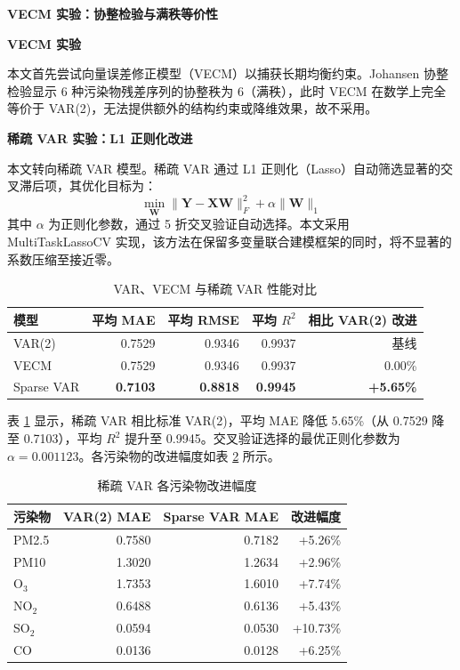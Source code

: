\documentclass[UTF8,a4paper,12pt]{ctexart}
\begin{document}
\textbf{VECM 实验：协整检验与满秩等价性}

\textbf{VECM 实验}

本文首先尝试向量误差修正模型（VECM）以捕获长期均衡约束。Johansen 协整检验显示 6 种污染物残差序列的协整秩为 6（满秩），此时 VECM 在数学上完全等价于 VAR(2)，无法提供额外的结构约束或降维效果，故不采用。

\textbf{稀疏 VAR 实验：L1 正则化改进}

本文转向稀疏 VAR 模型。稀疏 VAR 通过 L1 正则化（Lasso）自动筛选显著的交叉滞后项，其优化目标为：
\begin{equation}
\label{eq:sparse_var}
\min_{\mathbf{W}} \|\mathbf{Y} - \mathbf{X}\mathbf{W}\|_F^2 + \alpha\|\mathbf{W}\|_1
\end{equation}
其中 $\alpha$ 为正则化参数，通过 5 折交叉验证自动选择。本文采用 MultiTaskLassoCV 实现，该方法在保留多变量联合建模框架的同时，将不显著的系数压缩至接近零。

\begin{table}[H]
\centering
\caption{VAR、VECM 与稀疏 VAR 性能对比}
\label{tab:sparse_var_comparison}
\small
\begin{tabular}{lrrrr}
\toprule
模型 & 平均 MAE & 平均 RMSE & 平均 $R^2$ & 相比 VAR(2) 改进\\
\midrule
VAR(2) & 0.7529 & 0.9346 & 0.9937 & 基线\\
VECM & 0.7529 & 0.9346 & 0.9937 & 0.00\%\\
Sparse VAR & \textbf{0.7103} & \textbf{0.8818} & \textbf{0.9945} & \textbf{+5.65\%}\\
\bottomrule
\end{tabular}
\end{table}

表 \ref{tab:sparse_var_comparison} 显示，稀疏 VAR 相比标准 VAR(2)，平均 MAE 降低 5.65\%（从 0.7529 降至 0.7103），平均 $R^2$ 提升至 0.9945。交叉验证选择的最优正则化参数为 $\alpha=0.001123$。各污染物的改进幅度如表 \ref{tab:sparse_var_detail} 所示。

\begin{table}[H]
\centering
\caption{稀疏 VAR 各污染物改进幅度}
\label{tab:sparse_var_detail}
\small
\begin{tabular}{lrrr}
\toprule
污染物 & VAR(2) MAE & Sparse VAR MAE & 改进幅度\\
\midrule
PM2.5 & 0.7580 & 0.7182 & +5.26\%\\
PM10 & 1.3020 & 1.2634 & +2.96\%\\
O$_3$ & 1.7353 & 1.6010 & +7.74\%\\
NO$_2$ & 0.6488 & 0.6136 & +5.43\%\\
SO$_2$ & 0.0594 & 0.0530 & +10.73\%\\
CO & 0.0136 & 0.0128 & +6.25\%\\
\bottomrule
\end{tabular}
\end{table}
\end{document}
